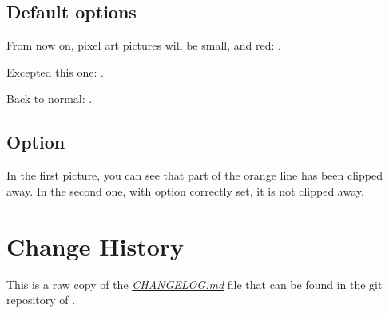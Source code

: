 \documentclass[
  load-preamble-,
  babel-options=english,
  add-index=true,
]{cnltx-doc}
\begin{document}
\subsection{Default options}
\label{example:default}

\begin{sidebyside}

  From now on, pixel art pictures will be small, and red:
  .

  Excepted this one:
  .

  Back to normal:
  .
\end{sidebyside}

\subsection{Option }
\label{example:margin}

In the first picture, you can see that part of the orange line has been clipped away. In the second one, with option  correctly set, it is not clipped away.

\begin{sidebyside}


\end{sidebyside}

\section{Change History}

This is a raw copy of the \href{https://framagit.org/spalax/pixelart/-/blob/main/CHANGELOG.md}{\textsl{CHANGELOG.md}} file that can be found in the git repository of .

\end{document}
